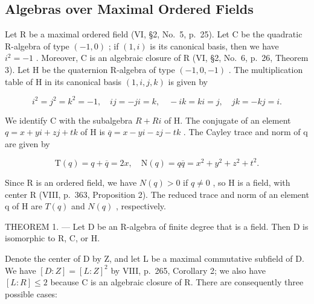 \subsection{Algebras over Maximal Ordered Fields}

Let R be a maximal ordered field (VI, §2, No.~5, p.~25). Let C be the quadratic R-algebra of type \((-1,0)\) ; if \((1,i)\) is its canonical basis, then we have \(i^{2}=-1\) . Moreover, C is an algebraic closure of R (VI, §2, No.~6, p.~26, Theorem 3). Let H be the quaternion R-algebra of type \((-1,0,-1)\) . The multiplication table of H in its canonical basis \((1,i,j,k)\) is given by

\[
i ^ {2} = j ^ {2} = k ^ {2} = - 1, \quad i j = - j i = k, \quad - i k = k i = j, \quad j k = - k j = i.
\]

We identify C with the subalgebra \(R + Ri\) of H. The conjugate of an element \(q = x + yi + zj + tk\) of H is \(\overline{q} = x - yi - zj - tk\) . The Cayley trace and norm of q are given by

\[
\mathrm{T} (q) = q + \overline {{q}} = 2 x, \quad \mathrm{N} (q) = q \overline {{q}} = x ^ {2} + y ^ {2} + z ^ {2} + t ^ {2}.
\]

Since R is an ordered field, we have \(N(q) > 0\) if \(q \neq 0\) , so H is a field, with center R (VIII, p.~363, Proposition 2). The reduced trace and norm of an element q of H are \(T(q)\) and \(N(q)\) , respectively.

THEOREM 1. --- Let D be an R-algebra of finite degree that is a field. Then D is isomorphic to R, C, or H.

Denote the center of D by Z, and let L be a maximal commutative subfield of D. We have \([D:Z]=[L:Z]^{2}\) by VIII, p.~265, Corollary 2; we also have \([L:R]\leqslant2\) because C is an algebraic closure of R. There are consequently three possible cases:

